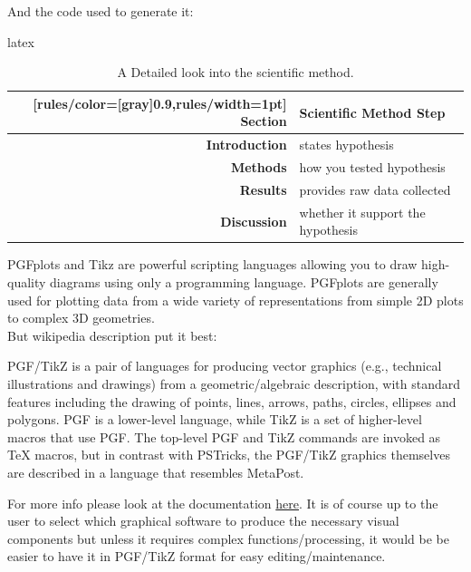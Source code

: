 \documentclass[minted, draw]{../tex/hebdomon}
\begin{document}
%
And the code used to generate it:
%
\begin{code}{latex}
\begin{table}[!ht]
	\begin{NiceTabular}{rX}[rules/color=[gray]{0.9},rules/width=1pt]
		\CodeBefore
		\Body
		\toprule
		\textbf{Section}      & \textbf{Scientific Method Step}    \\
		\midrule
		\textbf{Introduction} & states   hypothesis                \\
		\textbf{Methods}      & how you tested hypothesis          \\
		\textbf{Results}      & provides raw  data collected       \\
		\textbf{Discussion}   &  whether it support the hypothesis \\
		\bottomrule
	\end{NiceTabular}
	\caption{A Detailed look into the scientific method.}
\end{table}
\end{code}



PGFplots and Tikz are powerful scripting languages allowing you to draw high-quality diagrams
using only a programming language. PGFplots are generally used for plotting data from a wide
variety of representations from simple 2D plots to complex 3D geometries.
\\
But wikipedia description put it best:

\begin{excerpt}
	PGF/TikZ is a pair of languages for producing vector graphics
	(e.g., technical illustrations and drawings) from a geometric/algebraic description, with
	standard features including the drawing of points, lines, arrows, paths, circles,
	ellipses and polygons. PGF is a lower-level language, while TikZ is a set of higher-level
	macros that use PGF. The top-level PGF and TikZ commands are invoked as TeX macros,
	but in contrast with PSTricks, the PGF/TikZ graphics themselves are described in a
	language that resembles MetaPost.
\end{excerpt}

For more info please look at the documentation \href{https://tikz.dev/pgfplots/}{here}.
It is of course up to the user to select which graphical software to produce the necessary
visual components but unless it requires complex functions/processing, it would be be easier
to have it in PGF/TikZ format for easy editing/maintenance.
\end{document}
